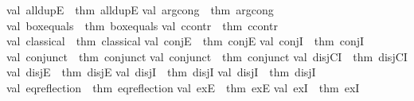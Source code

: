 \begin{isabellebody}
val\ all{\isacharunderscore}{\kern0pt}dupE\ {\isacharequal}{\kern0pt}\ {\isacharat}{\kern0pt}{\isacharbraceleft}{\kern0pt}thm\ all{\isacharunderscore}{\kern0pt}dupE{\isacharbraceright}{\kern0pt}\isanewline
val\ arg{\isacharunderscore}{\kern0pt}cong\ {\isacharequal}{\kern0pt}\ {\isacharat}{\kern0pt}{\isacharbraceleft}{\kern0pt}thm\ arg{\isacharunderscore}{\kern0pt}cong{\isacharbraceright}{\kern0pt}\isanewline
val\ box{\isacharunderscore}{\kern0pt}equals\ {\isacharequal}{\kern0pt}\ {\isacharat}{\kern0pt}{\isacharbraceleft}{\kern0pt}thm\ box{\isacharunderscore}{\kern0pt}equals{\isacharbraceright}{\kern0pt}\isanewline
val\ ccontr\ {\isacharequal}{\kern0pt}\ {\isacharat}{\kern0pt}{\isacharbraceleft}{\kern0pt}thm\ ccontr{\isacharbraceright}{\kern0pt}\isanewline
val\ classical\ {\isacharequal}{\kern0pt}\ {\isacharat}{\kern0pt}{\isacharbraceleft}{\kern0pt}thm\ classical{\isacharbraceright}{\kern0pt}\isanewline
val\ conjE\ {\isacharequal}{\kern0pt}\ {\isacharat}{\kern0pt}{\isacharbraceleft}{\kern0pt}thm\ conjE{\isacharbraceright}{\kern0pt}\isanewline
val\ conjI\ {\isacharequal}{\kern0pt}\ {\isacharat}{\kern0pt}{\isacharbraceleft}{\kern0pt}thm\ conjI{\isacharbraceright}{\kern0pt}\isanewline
val\ conjunct{}\ {\isacharequal}{\kern0pt}\ {\isacharat}{\kern0pt}{\isacharbraceleft}{\kern0pt}thm\ conjunct{}{\isacharbraceright}{\kern0pt}\isanewline
val\ conjunct{}\ {\isacharequal}{\kern0pt}\ {\isacharat}{\kern0pt}{\isacharbraceleft}{\kern0pt}thm\ conjunct{}{\isacharbraceright}{\kern0pt}\isanewline
val\ disjCI\ {\isacharequal}{\kern0pt}\ {\isacharat}{\kern0pt}{\isacharbraceleft}{\kern0pt}thm\ disjCI{\isacharbraceright}{\kern0pt}\isanewline
val\ disjE\ {\isacharequal}{\kern0pt}\ {\isacharat}{\kern0pt}{\isacharbraceleft}{\kern0pt}thm\ disjE{\isacharbraceright}{\kern0pt}\isanewline
val\ disjI{}\ {\isacharequal}{\kern0pt}\ {\isacharat}{\kern0pt}{\isacharbraceleft}{\kern0pt}thm\ disjI{}{\isacharbraceright}{\kern0pt}\isanewline
val\ disjI{}\ {\isacharequal}{\kern0pt}\ {\isacharat}{\kern0pt}{\isacharbraceleft}{\kern0pt}thm\ disjI{}{\isacharbraceright}{\kern0pt}\isanewline
val\ eq{\isacharunderscore}{\kern0pt}reflection\ {\isacharequal}{\kern0pt}\ {\isacharat}{\kern0pt}{\isacharbraceleft}{\kern0pt}thm\ eq{\isacharunderscore}{\kern0pt}reflection{\isacharbraceright}{\kern0pt}\isanewline
val\ ex{}E\ {\isacharequal}{\kern0pt}\ {\isacharat}{\kern0pt}{\isacharbraceleft}{\kern0pt}thm\ ex{}E{\isacharbraceright}{\kern0pt}\isanewline
val\ ex{}I\ {\isacharequal}{\kern0pt}\ {\isacharat}{\kern0pt}{\isacharbraceleft}{\kern0pt}thm\ ex{}I{\isacharbraceright}{\kern0pt}\isanewline

\end{isabellebody}
